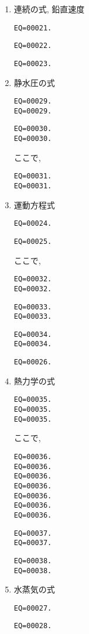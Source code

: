 \begin{enumerate}
\item 連続の式, 鉛直速度

\begin{verbatim}
EQ=00021.
\end{verbatim}
%
\begin{verbatim}
EQ=00022.
\end{verbatim}
%
\begin{verbatim}
EQ=00023.
\end{verbatim}
   
\item 静水圧の式

\begin{verbatim}
EQ=00029.
EQ=00029.
\end{verbatim}
%
\begin{verbatim}
EQ=00030.
EQ=00030.
\end{verbatim}
%
ここで,
%
\begin{verbatim}
EQ=00031.
EQ=00031.
\end{verbatim}

\item 運動方程式

\begin{verbatim}
EQ=00024.
\end{verbatim}
%
\begin{verbatim}
EQ=00025.
\end{verbatim}
%
ここで,
%
\begin{verbatim}
EQ=00032.
EQ=00032.
\end{verbatim}
%
\begin{verbatim}
EQ=00033.
EQ=00033.
\end{verbatim}
%
\begin{verbatim}
EQ=00034.
EQ=00034.
\end{verbatim}

\begin{verbatim}
EQ=00026.
\end{verbatim}

\item 熱力学の式

\begin{verbatim}
EQ=00035.
EQ=00035.
EQ=00035.
\end{verbatim}
%
ここで,
\begin{verbatim}
EQ=00036.
EQ=00036.
EQ=00036.
EQ=00036.
EQ=00036.
EQ=00036.
EQ=00036.
\end{verbatim}
%
\begin{verbatim}
EQ=00037.
EQ=00037.
\end{verbatim}
%
\begin{verbatim}
EQ=00038.
EQ=00038.
\end{verbatim}

\item 水蒸気の式

\begin{verbatim}
EQ=00027.
\end{verbatim}
%
\begin{verbatim}
EQ=00028.
\end{verbatim}

\end{enumerate}

